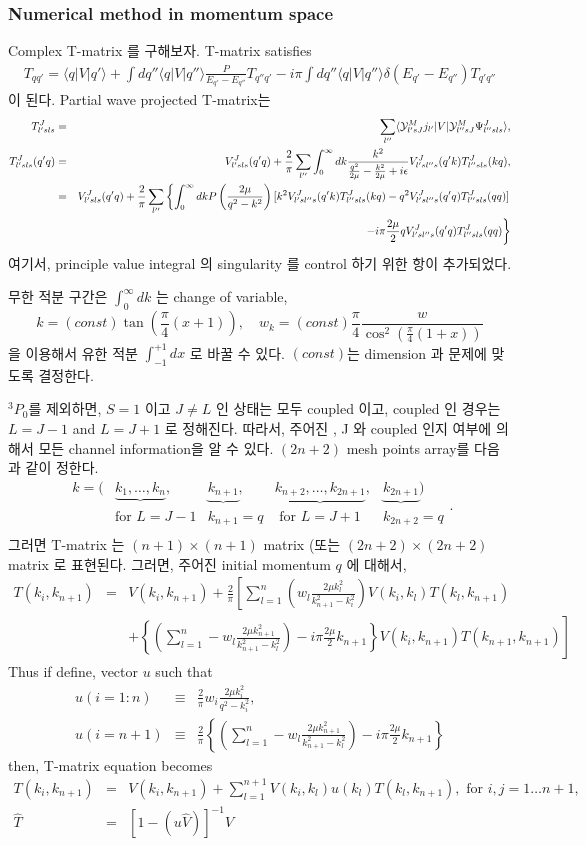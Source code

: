 \documentclass[10pt]{article}
\newcommand{\bea}{\begin{eqnarray}}
\newcommand{\eea}{\end{eqnarray}}
\newcommand{\no}{\nonumber \\}
\def\la{\langle}
\def\ra{\rangle}
\begin{document}
\subsubsection{Numerical method in momentum space}
Complex T-matrix 를 구해보자.
T-matrix satisfies
\bea
T_{qq'}=\la q|V|q'\ra+\int dq'' \la q|V|q''\ra\frac{P}{E_{q'}-E_{q''}} T_{q'' q'}
                                 -i\pi\int dq''\la q|V|q''\ra\delta(E_{q'}-E_{q''})T_{q' q''}
\eea
이 된다. 
Partial wave projected T-matrix는
\bea
T^J_{l'sls}
&=&\sum_{l''}\la {\cal Y}^{M}_{l' s J} j_{l'}|V|
               {\cal Y}^{M}_{l'' s J} \Psi^J_{l'' s ls}\ra,\no
T^J_{l'sls}(q' q)
&=& V^J_{l'sls}(q'q)+\frac{2}{\pi}\sum_{l''}
   \int_0^\infty dk 
   \frac{k^2}{\frac{q^2}{2\mu}-\frac{k^2}{2\mu}+i\epsilon}
   V^J_{l'sl''s}(q'k)T^J_{l''s ls}(kq),\no
&=&V^J_{l'sls}(q'q)+\frac{2}{\pi}\sum_{l''}
   \left\{
   \int_0^\infty dk 
   P\left(\frac{2\mu}{q^2-k^2}\right)
   [k^2 V^J_{l'sl''s}(q'k)T^J_{l''s ls}(kq)
   -q^2 V^J_{l'sl''s}(q'q)T^J_{l''s ls}(q q)]
   \right.\no & &\left.
   -i\pi \frac{2\mu}{2}q V^J_{l'sl''s}(q'q)T^J_{l''s ls}(qq)
   \right\}
\eea
여기서, principle value integral 의 singularity 를 
control 하기 위한 항이 추가되었다. 

무한 적분 구간은 $\int_0^\infty dk$ 는 change of variable,
$$k=(const)\tan(\frac{\pi}{4}(x+1)),\quad 
w_k=(const)\frac{\pi}{4}\frac{w}{\cos^2(\frac{\pi}{4}(1+x))}$$
을 이용해서 
유한 적분 $\int_{-1}^{+1} dx$ 로 바꿀 수 있다. $(const)$는 dimension
과 문제에 맞도록 결정한다.

${}^3P_0$를 제외하면, $S=1$ 이고 $J\neq L$ 인 상태는 모두 coupled 이고,
coupled 인 경우는 $L=J-1$ and $L=J+1$ 로 정해진다. 따라서, 주어진 ,
J 와 coupled 인지 여부에 의해서 모든 channel information을 알 수 있다.
$(2n+2)$ mesh points array를 다음과 같이 정한다. 
\begin{equation}
\begin{array}{ccccc} 
k=( & \underbrace{k_1,\dots,k_n},&\underbrace{ k_{n+1}},&
   \underbrace{k_{n+2},\dots,k_{2n+1}}, & \underbrace{k_{2n+1}}) \\
    & \mbox{for $L=J-1$}  & k_{n+1}=q  & \mbox{ for $L=J+1$} & k_{2n+2}=q \\
    \end{array}.
\end{equation}
 그러면 T-matrix 는 $(n+1)\times(n+1)$ matrix 
 (또는 $(2n+2)\times(2n+2)$ matrix
로 표현된다. 그러면, 주어진 initial momentum $q$ 에 대해서,
\bea
T(k_i,k_{n+1})&=&V(k_i,k_{n+1})
+\frac{2}{\pi}\left[\sum_{l=1}^{n} 
 \left( w_l \frac{2\mu k_l^2 }{k^2_{n+1}-k_i^2}\right) 
  V(k_i,k_l)T(k_l,k_{n+1})
  \right.\no 
& &+ \left. \left\{\left(\sum_{l=1}^n  -w_l\frac{2\mu k_{n+1}^2 }{k_{n+1}^2-k_l^2}\right)
   -i\pi \frac{2\mu}{2} k_{n+1}\right\} 
    V(k_i,k_{n+1})T(k_{n+1},k_{n+1})
\right]
\eea
Thus if define, vector $u$ such that
\bea
u(i=1:n)&\equiv& \frac{2}{\pi} w_i\frac{2\mu k_i^2}{q^2-k_i^2},\no
u(i=n+1)&\equiv& \frac{2}{\pi}
         \left\{\left(\sum_{l=1}^n  -w_l\frac{2\mu k_{n+1}^2 }{k_{n+1}^2-k_l^2}\right)
   -i\pi \frac{2\mu}{2} k_{n+1}\right\}
\eea
then, T-matrix equation becomes
\bea
T(k_i,k_{n+1})&=&V(k_i,k_{n+1})
 +\sum_{l=1}^{n+1} V(k_i,k_l)u(k_l) T(k_l,k_{n+1}),
\mbox{ for $i,j=1\dots n+1$},\no
\hat{T}&=&[1-(u \hat{V})]^{-1} \hat{V}
\eea
\end{document}
